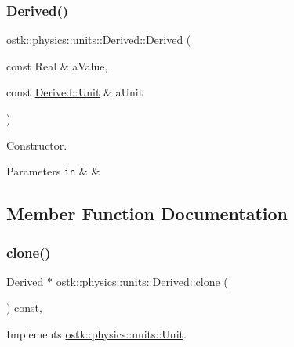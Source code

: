 \subsubsection{\texorpdfstring{Derived()}{Derived()}}
{\footnotesize\ttfamily ostk\+::physics\+::units\+::\+Derived\+::\+Derived (\begin{DoxyParamCaption}\item[{const Real \&}]{a\+Value,  }\item[{const \hyperlink{classostk_1_1physics_1_1units_1_1_derived_1_1_unit}{Derived\+::\+Unit} \&}]{a\+Unit }\end{DoxyParamCaption})}



Constructor. 


\begin{DoxyCode}
\end{DoxyCode}



\begin{DoxyParams}[1]{Parameters}
\mbox{\tt in}  & {\em } & \\
\hline
\end{DoxyParams}


\subsection{Member Function Documentation}
\mbox{\label{classostk_1_1physics_1_1units_1_1_derived_a72a1ae09398204d52a9078da6d36d9d7}} 
\subsubsection{\texorpdfstring{clone()}{clone()}}
{\footnotesize\ttfamily \hyperlink{classostk_1_1physics_1_1units_1_1_derived}{Derived} $\ast$ ostk\+::physics\+::units\+::\+Derived\+::clone (\begin{DoxyParamCaption}{ }\end{DoxyParamCaption}) const\hspace{0.3cm}{\ttfamily [override]}, {\ttfamily [virtual]}}



Implements \hyperlink{classostk_1_1physics_1_1units_1_1_unit_ab203628f8a16b16c28d89eaa4c3aff67}{ostk\+::physics\+::units\+::\+Unit}.

